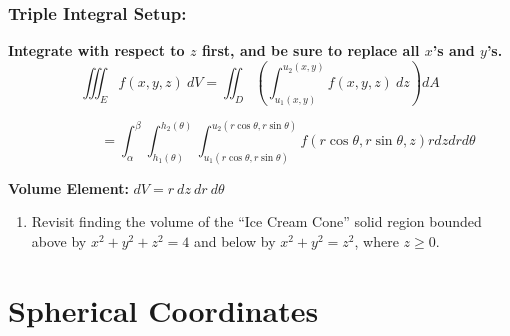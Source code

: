 \subsubsection*{Triple Integral Setup:}
\textbf{Integrate with respect to \(z\) first, and be sure to replace all \(x\)'s and \(y\)'s.}
\[
\iiint_{E} f(x,y,z)\ dV = \iint_{D} \left(\int_{u_1(x,y)}^{u_2(x,y)} f(x,y,z)\ dz\right) dA
\]

\[
\qquad \qquad =\int_\alpha^\beta \int_{h_1(\theta)}^{h_2(\theta)} \int_{u_1(r\cos\theta, r\sin\theta)}^{u_2(r\cos\theta, r\sin\theta)} f\left(r\cos\theta, r\sin\theta,z\right) r dzdrd\theta
\]

\textbf{Volume Element: }\({dV = r\ dz\ dr\ d\theta}\)










\begin{enumerate}[{Example} 1: ]


\item Revisit finding the volume of the ``Ice Cream Cone'' solid region bounded above by \(x^2+y^2+z^2=4\) and below by \(x^2+y^2 = z^2\), where \(z\geq 0\).


\end{enumerate}

\pagebreak

\section*{Spherical Coordinates}


\hspace*{-.8in}%


